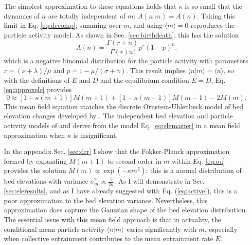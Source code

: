 The simplest approximation to these equations holds that $\kappa$ is so small that the dynamics of $n$ are totally independent of $m$: $A(n|m) = A(n)$. Taking this limit in Eq. \ref{eq:decomp}, summing over $m$, and using $\langle m \rangle = 0$ reproduces the \citet{Ancey2008} particle activity model.
As shown in Sec. \ref{sec:birthdeath}, this has the solution
\begin{equation} A(n) = \frac{\Gamma(r+n)}{\Gamma(r)n!}p^r(1-p)^n.\label{eq:ancey}\end{equation}
which is a negative binomial distribution for the particle activity with parameters $r=(\nu+\lambda)/\mu$ and $p=1-\mu/(\sigma+\gamma).$
This result implies $\langle n | m \rangle = \langle n \rangle$, so with the definitions of $E$ and $D$ and the equilibrium condition $E=D$, Eq. \ref{eq:approxele} provides
\begin{equation}0 \approx [1+\kappa(m+1)]M(m+1) + [1-\kappa(m-1)]M(m-1)-2M(m). \label{eq:ou} \end{equation}
This mean field equation matches the discrete Ornstein-Uhlenbeck model of bed elevation changes developed by \citet{Martin2014}.
The independent bed elevation and particle activity models of \citet{Martin2014} and \citet{Ancey2008} derive from the model Eq. \ref{eq:elemaster} in a mean field approximation when $\kappa$ is insignificant.

In the appendix Sec. \ref{sec:drr} I show that the Fokker-Planck approximation \citep{Gardiner1983} formed by expanding $M(m\pm 1)$ to second order in $m$ within Eq. \ref{eq:ou} provides the solution $M(m) \propto \exp(-\kappa m^2)$: this is a normal distribution of bed elevations with variance $\sigma_m^2 \propto \frac{1}{2\kappa}$.
As I will demonstrate in Sec. \ref{sec:eleresults}, and as I have already suggested with Eq. (\ref{eq:active}), this is a poor approximation to the bed elevation variance. Nevertheless, this approximation does capture the Gaussian shape of the bed elevation distribution.
The essential issue with this mean field approach is that in actuality, the conditional mean particle activity $\langle n | m \rangle$ varies significantly with $m$, especially when collective entrainment contributes to the mean entrainment rate $E$.

